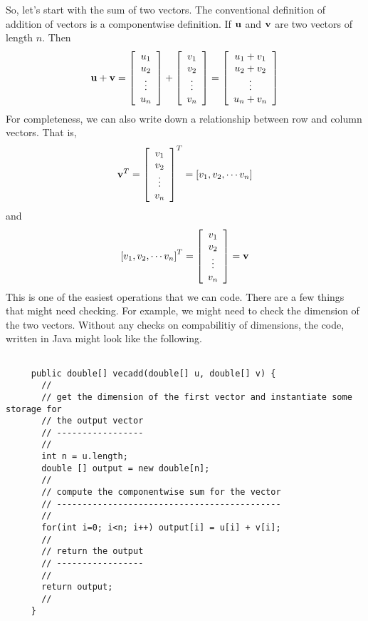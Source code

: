 \documentclass[10pt,fleqn]{article}
\begin{document}
So, let's start with the sum of two vectors. The conventional definition of
addition of vectors is a componentwise definition. If ${\bf u}$ and ${\bf v}$
are two vectors of length $n$. Then
$$
  {\bf u} + {\bf v} = 
       \left[
         \begin{array}{c}
           u_1 \\
           u_2 \\
           \vdots \\
           u_n
         \end{array}
       \right]
     + \left[
         \begin{array}{c}
           v_1 \\
           v_2 \\
           \vdots \\
           v_n
         \end{array}
       \right]
     = \left[
         \begin{array}{c}
           u_1 + v_1 \\
           u_2 + v_2 \\
           \vdots \\
           u_n + v_n
         \end{array}
       \right]
$$
For completeness, we can also write down a relationship between row and column
vectors. That is,
$$
  {\bf v}^T = 
       \left[
         \begin{array}{c}
           v_1 \\
           v_2 \\
           \vdots \\
           v_n
         \end{array}
       \right]^T
     = \left[
         v_1, v_2, \cdots v_n
       \right]
$$
and
\noindent
$$
  \left[ v_1, v_2, \cdots v_n \right]^T
     = \left[
         \begin{array}{c}
           v_1 \\
           v_2 \\
           \vdots \\
           v_n
         \end{array}
       \right] = {\bf v}
$$
This is one of the easiest operations that we can code. There are a few things
that might need checking. For example, we might need to check the dimension of
the two vectors. Without any checks on compabilitiy of dimensions, the code,
written in Java might look like the following.
\begin{verbatim}

     public double[] vecadd(double[] u, double[] v) {
       //
       // get the dimension of the first vector and instantiate some storage for
       // the output vector
       // -----------------
       //
       int n = u.length;
       double [] output = new double[n];
       //
       // compute the componentwise sum for the vector
       // --------------------------------------------
       //
       for(int i=0; i<n; i++) output[i] = u[i] + v[i];
       //
       // return the output
       // -----------------
       //
       return output;
       //
     }

\end{verbatim}
\end{document}
